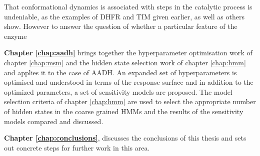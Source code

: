 That conformational dynamics is associated with steps in the catalytic process is undeniable, as the examples of DHFR and TIM given earlier, as well as others \cite{hammesMultipleConformationalChanges2002, hammes-schifferRelatingProteinMotion2006a} show.  However to answer the question of whether a particular feature of the enzyme 


\textbf{Chapter \ref{chap:aadh}} brings together the hyperparameter optimisation work of chapter  \ref{chap:msm} and the hidden state selection work of chapter \ref{chap:hmm} and applies it to the case of AADH. An expanded set of hyperparameters is optimised and understood in terms of the response surface and in addition to the optimized parameters, a set of sensitivity models are proposed. The model selection criteria of chapter \ref{chap:hmm} are used to select the appropriate number of hidden states in the coarse grained HMMs and the results of the sensitivity models compared and discussed. 

\textbf{Chapter \ref{chap:conclusions}}, discusses the conclusions of this thesis and sets out concrete steps for further work in this area. 
















